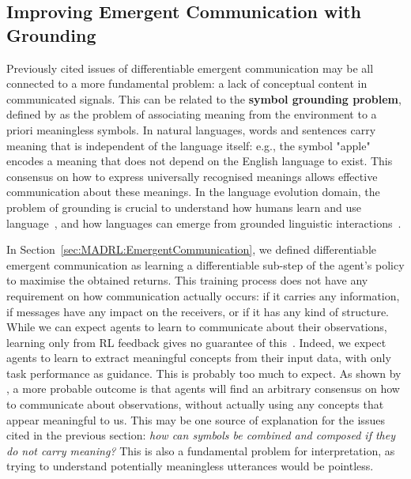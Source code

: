 \subsection{Improving Emergent Communication with Grounding}\label{sec:LAMAC:RW_Grouding}

Previously cited issues of differentiable emergent communication may be all connected to a more fundamental problem: a lack of conceptual content in communicated signals. This can be related to the \textbf{symbol grounding problem}, defined by \citet{Harnad1990_SymbolGrounding} as the problem of associating meaning from the environment to a priori meaningless symbols. In natural languages, words and sentences carry meaning that is independent of the language itself: e.g., the symbol "apple" encodes a meaning that does not depend on the English language to exist. This consensus on how to express universally recognised meanings allows effective communication about these meanings. In the language evolution domain, the problem of grounding is crucial to understand how humans learn and use language~\citep{Siskind1992_LangAcquis, Brent2001_VocDev}, and how languages can emerge from grounded linguistic interactions~\citep{Steels2000_AIBO, Vogt2002_PhysicalGrounding, Steels2015_TalkingHeads, Nevens2020_ConceptLearn, Botoko2024_LingConvent}. 

In Section~\ref{sec:MADRL:EmergentCommunication}, we defined differentiable emergent communication as learning a differentiable sub-step of the agent's policy to maximise the obtained returns. This training process does not have any requirement on how communication actually occurs: if it carries any information, if messages have any impact on the receivers, or if it has any kind of structure. While we can expect agents to learn to communicate about their observations, learning only from RL feedback gives no guarantee of this~\citep{Lowe2019_Pitfalls}. Indeed, we expect agents to learn to extract meaningful concepts from their input data, with only task performance as guidance. This is probably too much to expect. As shown by \citet{Bouchacourt2018_HowAgentsSee}, a more probable outcome is that agents will find an arbitrary consensus on how to communicate about observations, without actually using any concepts that appear meaningful to us. This may be one source of explanation for the issues cited in the previous section: \textit{how can symbols be combined and composed if they do not carry meaning?} This is also a fundamental problem for interpretation, as trying to understand potentially meaningless utterances would be pointless. 

